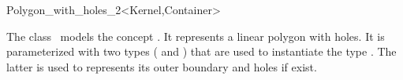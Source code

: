 \ccRefPageBegin

\begin{ccRefClass}{Polygon_with_holes_2<Kernel,Container>}

\ccThreeToTwo

\ccDefinition
The class \ccRefName\ models the concept .
It represents a linear polygon with holes. It is parameterized with two
types ( and ) that are used to instantiate
the type . The latter is used to
represents its outer boundary and holes if exist.

 
\ccIsModel

\end{ccRefClass}
\ccRefPageEnd
